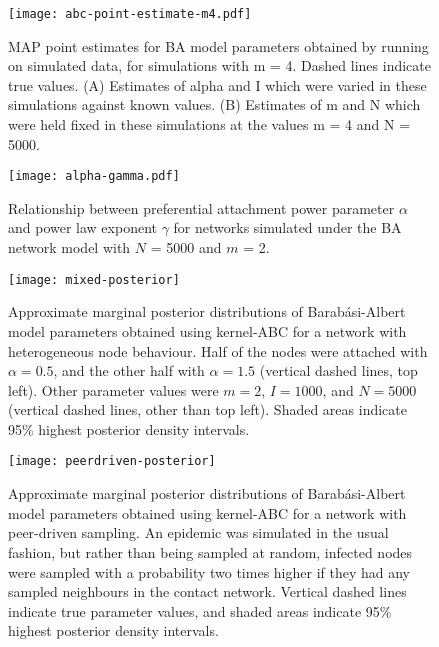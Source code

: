 \begin{figure}[ht]
  \centering
  \texttt{[image: abc-point-estimate-m4.pdf]}
  \caption[
    \Acrlong{MAP} point estimates for \gls{BA} model parameters obtained by
    running  on simulated data, for simulations with \gls{m} = 3.
  ]{
    \Acrlong{MAP} point estimates for \gls{BA} model parameters obtained by
    running  on simulated data, for simulations with \gls{m} = 4.
    Dashed lines indicate true values. (A) Estimates of \gls{alpha} and \gls{I}
    which were varied in these simulations against known values. (B) Estimates
    of \gls{m} and \gls{N} which were held fixed in these simulations at the
    values \gls{m} = 4 and \gls{N} = 5000.
  }        
  \label{fig:abcptm4}
\end{figure}

\begin{figure}[ht]
  \centering
  \texttt{[image: alpha-gamma.pdf]}
  \caption{
      Relationship between preferential attachment power parameter $\alpha$
      and power law exponent $\gamma$ for networks simulated under the BA
      network model with $N$ = 5000 and $m$ = 2.
  }
  \label{fig:gamma}
\end{figure}

\begin{figure}[ht]
    \centering
    \texttt{[image: mixed-posterior]}
    \caption[Approximate marginal posterior distributions of BA model
        parameters obtained using kernel-ABC for a network with heterogeneous
        node behaviour.]
    {
        Approximate marginal posterior distributions of Barab\'asi-Albert
        model parameters obtained using kernel-ABC for a network with
        heterogeneous node behaviour. Half of the nodes were attached with
        $\alpha = 0.5$, and the other half with $\alpha = 1.5$ (vertical
        dashed lines, top left). Other parameter values were $m = 2$, $I =
        1000$, and $N = 5000$ (vertical dashed lines, other than top left).
        Shaded areas indicate 95\% highest posterior density intervals.
    }
    \label{fig:mixed}
\end{figure}

\begin{figure}[ht]
    \centering
    \texttt{[image: peerdriven-posterior]}
    \caption[Approximate marginal posterior distributions of Barab\'asi-Albert
        model parameters obtained using kernel-ABC for a network with
        peer-driven sampling.]
    {
        Approximate marginal posterior distributions of Barab\'asi-Albert
        model parameters obtained using kernel-ABC for a network with
        peer-driven sampling. An epidemic was simulated in the usual fashion,
        but rather than being sampled at random, infected nodes were sampled
        with a probability two times higher if they had any sampled neighbours
        in the contact network. Vertical dashed lines indicate true parameter
        values, and shaded areas indicate 95\% highest posterior density
        intervals.
    }
    \label{fig:peerdriven}
\end{figure}


